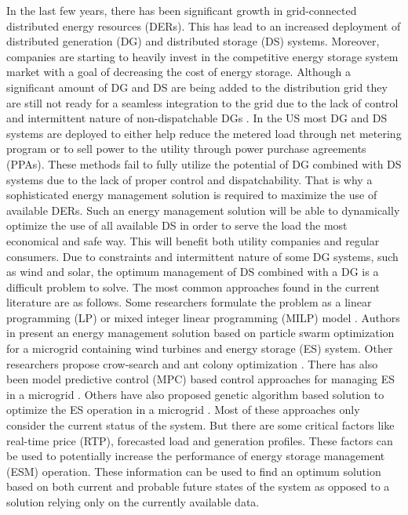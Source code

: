 In the last few years, there has been significant growth in grid-connected distributed energy resources (DERs). This has lead to an increased deployment of distributed generation (DG) and distributed storage (DS) systems. Moreover, companies are starting to heavily invest in the competitive energy storage system market with a goal of decreasing the cost of energy storage. Although a significant amount of DG and DS are being added to the distribution grid they are still not ready for a seamless integration to the grid due to the lack of control and intermittent nature of non-dispatchable DGs \cite{denholm2016path}. In the US most DG and DS systems are deployed to either help reduce the metered load through net metering program or to sell power to the utility through power purchase agreements (PPAs). These methods fail to fully utilize the potential of DG combined with DS systems due to the lack of proper control and dispatchability. That is why a sophisticated energy management solution is required to maximize the use of available DERs. Such an energy management solution will be able to dynamically optimize the use of all available DS in order to serve the load the most economical and safe way. This will benefit both utility companies and regular consumers. Due to constraints and intermittent nature of some DG systems, such as wind and solar, the optimum management of DS combined with a DG is a difficult problem to solve. The most common approaches found in the current literature are as follows. Some researchers formulate the problem as a linear programming (LP) or mixed integer linear programming (MILP) model \cite{lp73, lp74, lp75}. Authors in \cite{pso80, pso81} present an energy management solution based on particle swarm optimization for a microgrid containing wind turbines and energy storage (ES) system. Other researchers propose crow-search \cite{csa87} and ant colony optimization \cite{aco84}. There has also been model predictive control (MPC) based control approaches for managing ES in a microgrid \cite{energymanajaboulay,mpcmorstyn}. Others have also proposed genetic algorithm based solution to optimize the ES operation in a microgrid \cite{ga76, ga77}. Most of these approaches only consider the current status of the system. But there are some critical factors like real-time price (RTP), forecasted load and generation profiles. These factors can be used to potentially increase the performance of energy storage management (ESM) operation. These information can be used to find an optimum solution based on both current and probable future states of the system as opposed to a solution relying only on the currently available data.

